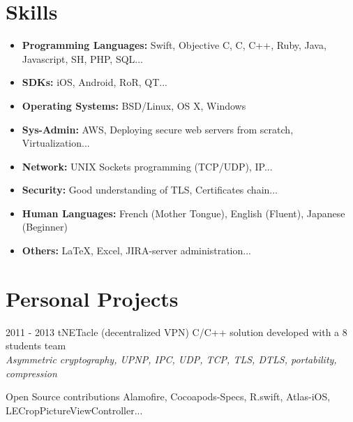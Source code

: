\documentclass[]{template/friggeri-cv} %
\begin{document}

\section{Skills}

\begin{itemize}
\item \textbf{Programming Languages:} Swift, Objective C, C, C++, Ruby, Java, Javascript, SH, PHP, SQL...
\item \textbf{SDKs:} iOS, Android, RoR, QT...
\item \textbf{Operating Systems:} BSD/Linux, OS X, Windows
\item \textbf{Sys-Admin:} AWS, Deploying secure web servers from scratch, Virtualization...
\item \textbf{Network:} UNIX Sockets programming (TCP/UDP), IP...
\item \textbf{Security:} Good understanding of TLS, Certificates chain...
\item \textbf{Human Languages:} French (Mother Tongue), English (Fluent), Japanese (Beginner)
\item \textbf{Others:} \LaTeX, Excel, JIRA-server administration...
\end{itemize}


\section{Personal Projects}
\begin{entrylist}
  \entry
      {2011 - 2013}
      {tNETacle (decentralized VPN)}
      {}
      {C/C++ solution developed with a 8 students team \\
      \emph{Asymmetric cryptography, UPNP, IPC, UDP, TCP, TLS, DTLS, portability, compression}}

\entry
{}
{Open Source contributions}
{}
{Alamofire, Cocoapods-Specs, R.swift, Atlas-iOS, LECropPictureViewController...}


\end{entrylist}
\end{document}

